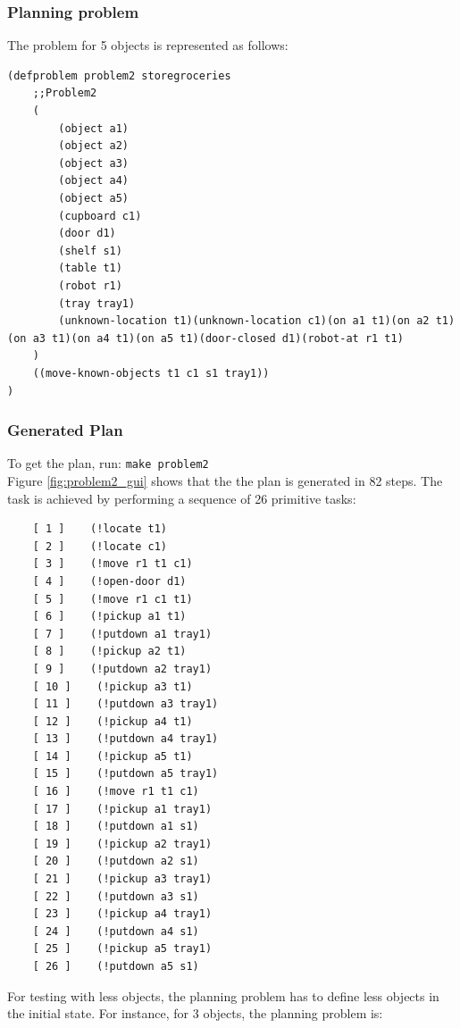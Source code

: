 \documentclass[paper=a4, fontsize=11pt]{scrartcl}
\begin{document}
	\subsubsection*{Planning problem}
	
	The problem for 5 objects is represented as follows:
	
	\begin{lstlisting}
(defproblem problem2 storegroceries
	;;Problem2
	(
		(object a1)
		(object a2)
		(object a3)
		(object a4)
		(object a5)
		(cupboard c1)
		(door d1)
		(shelf s1)
		(table t1)
		(robot r1)
		(tray tray1)
		(unknown-location t1)(unknown-location c1)(on a1 t1)(on a2 t1)(on a3 t1)(on a4 t1)(on a5 t1)(door-closed d1)(robot-at r1 t1)
	)
	((move-known-objects t1 c1 s1 tray1))
)
	\end{lstlisting}
	
	\subsubsection*{Generated Plan}
	
	To get the plan, run: \verb|make problem2| \\
	
	Figure \ref{fig:problem2_gui} shows that the the plan is generated in 82 steps. The task is achieved by performing a sequence of 26 primitive tasks: \\
	
	\begin{lstlisting}
	[ 1 ]    (!locate t1)
	[ 2 ]    (!locate c1)
	[ 3 ]    (!move r1 t1 c1)
	[ 4 ]    (!open-door d1)
	[ 5 ]    (!move r1 c1 t1)
	[ 6 ]    (!pickup a1 t1)
	[ 7 ]    (!putdown a1 tray1)
	[ 8 ]    (!pickup a2 t1)
	[ 9 ]    (!putdown a2 tray1)
	[ 10 ]    (!pickup a3 t1)
	[ 11 ]    (!putdown a3 tray1)
	[ 12 ]    (!pickup a4 t1)
	[ 13 ]    (!putdown a4 tray1)
	[ 14 ]    (!pickup a5 t1)
	[ 15 ]    (!putdown a5 tray1)
	[ 16 ]    (!move r1 t1 c1)
	[ 17 ]    (!pickup a1 tray1)
	[ 18 ]    (!putdown a1 s1)
	[ 19 ]    (!pickup a2 tray1)
	[ 20 ]    (!putdown a2 s1)
	[ 21 ]    (!pickup a3 tray1)
	[ 22 ]    (!putdown a3 s1)
	[ 23 ]    (!pickup a4 tray1)
	[ 24 ]    (!putdown a4 s1)
	[ 25 ]    (!pickup a5 tray1)
	[ 26 ]    (!putdown a5 s1)
	\end{lstlisting} 
	
	\vspace{5mm}
	
	
	For testing with less objects, the planning problem has to define less objects in the initial state. For instance, for 3 objects, the planning problem is: \\
	
\end{document}

